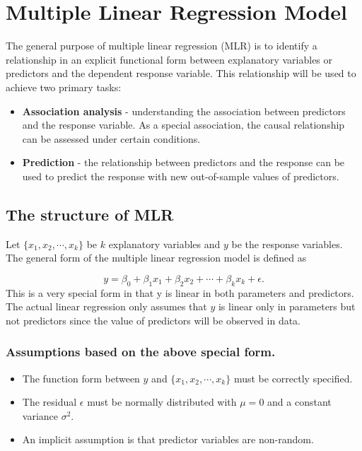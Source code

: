 \documentclass[
]{book}
\providecommand{\tightlist}{%
  \setlength{\itemsep}{0pt}\setlength{\parskip}{0pt}}
\begin{document}
\hypertarget{multiple-linear-regression-model}{%
\chapter{Multiple Linear Regression Model}\label{multiple-linear-regression-model}}

The general purpose of multiple linear regression (MLR) is to identify a relationship in an explicit functional form between explanatory variables or predictors and the dependent response variable. This relationship will be used to achieve two primary tasks:

\begin{itemize}
\item
  \textbf{Association analysis} - understanding the association between predictors and the response variable. As a special association, the causal relationship can be assessed under certain conditions.
\item
  \textbf{Prediction} - the relationship between predictors and the response can be used to predict the response with new out-of-sample values of predictors.
\end{itemize}

\hypertarget{the-structure-of-mlr}{%
\section{The structure of MLR}\label{the-structure-of-mlr}}

Let \(\{x_1, x_2, \cdots, x_k \}\) be \(k\) explanatory variables and \(y\) be the response variables. The general form of the multiple linear regression model is defined as

\[
y = \beta_0 + \beta_1 x_1 + \beta_2 x_2 + \cdots + \beta_k x_k + \epsilon.
\]
This is a very special form in that y is linear in both parameters and predictors. The actual linear regression only assumes that \(y\) is linear only in parameters but not predictors since the value of predictors will be observed in data.

\hypertarget{assumptions-based-on-the-above-special-form.}{%
\subsection{Assumptions based on the above special form.}\label{assumptions-based-on-the-above-special-form.}}

\begin{itemize}
\tightlist
\item
  The function form between \(y\) and \(\{x_1, x_2, \cdots, x_k \}\) must be correctly specified.
\item
  The residual \(\epsilon\) must be normally distributed with \(\mu = 0\) and a constant variance \(\sigma^2\).
\item
  An implicit assumption is that predictor variables are non-random.
\end{itemize}
\end{document}
